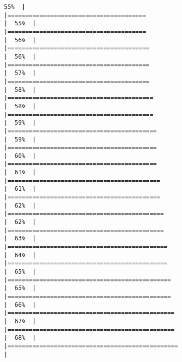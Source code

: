 \documentclass[
]{book}
\begin{document}
\begin{verbatim}
55%  |                                                                              |=======================================                               |  55%  |                                                                              |=======================================                               |  56%  |                                                                              |========================================                              |  56%  |                                                                              |========================================                              |  57%  |                                                                              |========================================                              |  58%  |                                                                              |=========================================                             |  58%  |                                                                              |=========================================                             |  59%  |                                                                              |==========================================                            |  59%  |                                                                              |==========================================                            |  60%  |                                                                              |==========================================                            |  61%  |                                                                              |===========================================                           |  61%  |                                                                              |===========================================                           |  62%  |                                                                              |============================================                          |  62%  |                                                                              |============================================                          |  63%  |                                                                              |=============================================                         |  64%  |                                                                              |=============================================                         |  65%  |                                                                              |==============================================                        |  65%  |                                                                              |==============================================                        |  66%  |                                                                              |===============================================                       |  67%  |                                                                              |===============================================                       |  68%  |                                                                              |================================================                      |  
\end{verbatim}
\end{document}
